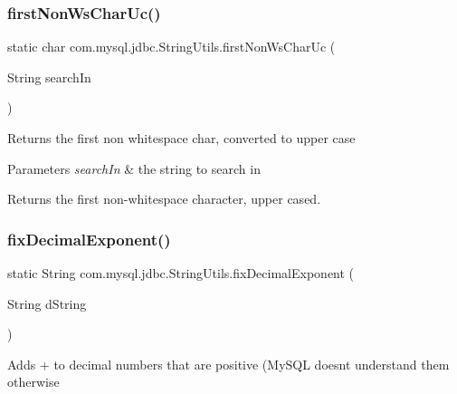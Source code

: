 \subsubsection{\texorpdfstring{first\+Non\+Ws\+Char\+Uc()}{firstNonWsCharUc()}}
{\footnotesize\ttfamily static char com.\+mysql.\+jdbc.\+String\+Utils.\+first\+Non\+Ws\+Char\+Uc (\begin{DoxyParamCaption}\item[{String}]{search\+In }\end{DoxyParamCaption})\hspace{0.3cm}{\ttfamily [static]}}

Returns the first non whitespace char, converted to upper case


\begin{DoxyParams}{Parameters}
{\em search\+In} & the string to search in\\
\hline
\end{DoxyParams}
\begin{DoxyReturn}{Returns}
the first non-\/whitespace character, upper cased. 
\end{DoxyReturn}
\mbox{\label{classcom_1_1mysql_1_1jdbc_1_1_string_utils_afb8f4c9222ba22bd576dfb94ec65f625}} 
\subsubsection{\texorpdfstring{fix\+Decimal\+Exponent()}{fixDecimalExponent()}}
{\footnotesize\ttfamily static String com.\+mysql.\+jdbc.\+String\+Utils.\+fix\+Decimal\+Exponent (\begin{DoxyParamCaption}\item[{String}]{d\+String }\end{DoxyParamCaption})\hspace{0.3cm}{\ttfamily [static]}}

Adds \textquotesingle{}+\textquotesingle{} to decimal numbers that are positive (My\+S\+QL doesn\textquotesingle{}t understand them otherwise


